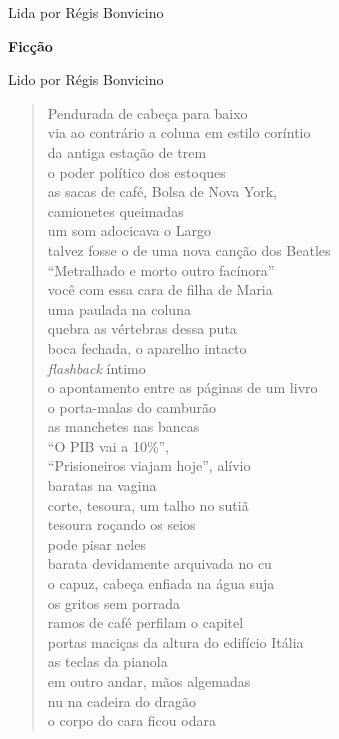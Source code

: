 Lida por Régis Bonvicino

\pagebreak

\textbf{Ficção}

Lido por Régis Bonvicino

\begin{verse}
Pendurada de cabeça para baixo\\
via ao contrário a coluna em estilo coríntio\\
da antiga estação de trem\\
o poder político dos estoques\\[5pt]
as sacas de café, Bolsa de Nova York,\\
camionetes queimadas\\
um som adocicava o Largo\\
talvez fosse o de uma nova canção dos Beatles\\[5pt]
``Metralhado e morto outro facínora''\\
você com essa cara de filha de Maria\\
uma paulada na coluna\\
quebra as vértebras dessa puta\\[5pt]
boca fechada, o aparelho intacto\\
\emph{flashback} íntimo\\
o apontamento entre as páginas de um livro\\
o porta-malas do camburão\\[5pt]
as manchetes nas bancas\\
``O PIB vai a 10\%'',\\
``Prisioneiros viajam hoje'', alívio\\
baratas na vagina\\[5pt]
corte, tesoura, um talho no sutiã\\
tesoura roçando os seios\\
pode pisar neles\\
barata devidamente arquivada no cu\\[5pt]
o capuz, cabeça enfiada na água suja\\
os gritos sem porrada\\
ramos de café perfilam o capitel\\
portas maciças da altura do edifício Itália\\[5pt]
as teclas da pianola\\
em outro andar, mãos algemadas\\
nu na cadeira do dragão\\
o corpo do cara ficou odara
\end{verse}

